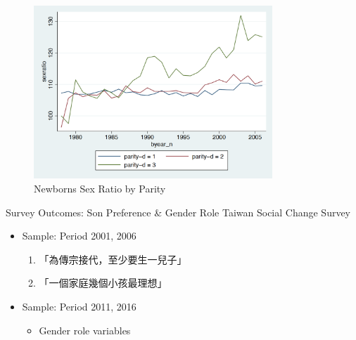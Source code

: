 \documentclass[
  10pt,
  ignorenonframetext,
  aspectratio=43,
]{beamer}
\providecommand{\tightlist}{%
  \setlength{\itemsep}{0pt}\setlength{\parskip}{0pt}}
\begin{document}
\begin{frame}
\begin{figure}
\centering
\includegraphics[width=0.8\textwidth,height=\textheight]{graphs/sexratioByParity.png}
\caption{Newborns Sex Ratio by Parity}
\end{figure}
\end{frame}

\begin{frame}
\begin{block}{Survey Outcomes: Son Preference \& Gender Role}
\protect\hypertarget{survey-outcomes-son-preference-gender-role}{}
Taiwan Social Change Survey

\begin{itemize}
\tightlist
\item
  Sample: Period 2001, 2006

  \begin{enumerate}
  \tightlist
  \item
    「為傳宗接代，至少要生一兒子」
  \item
    「一個家庭幾個小孩最理想」
  \end{enumerate}
\item
  Sample: Period 2011, 2016

  \begin{itemize}
  \tightlist
  \item
    Gender role variables
  \end{itemize}
\end{itemize}
\end{block}
\end{frame}
\end{document}
